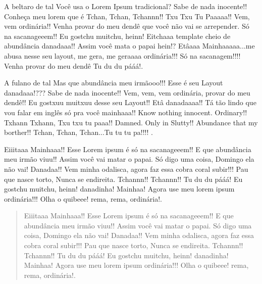 \documentclass{abnt}
\begin{document}
  \begin{agradecimentos}
  A beltaro de tal Você usa o Lorem Ipsum tradicional? Sabe de nada inocente!! Conheça meu lorem que é Tchan, Tchan, Tchannn!! Txu Txu Tu Paaaaa!! Vem, vem ordinária!! Venha provar do meu dendê que você não vai se arrepender. Só na sacanageeem!! Eu gostchu muitchu, heinn! Eitchaaa template cheio de abundância danadaaa!! Assim você mata o papai hein!? Etâaaa Mainhaaaaa...me abusa nesse seu layout, me gera, me geraaaa ordinária!!! Só na sacanagem!!!! Venha provar do meu dendê Tu du du pááá!.
  
  A fulano de tal Mas que abundância meu irmãooo!!! Esse é seu Layout danadaaa!??? Sabe de nada inocente!! Vem, vem, vem ordinária, provar do meu dendê!! Eu gostxuu muitxuu desse seu Layout!! Etâ danadaaaa!! Tá tão lindo que vou falar em inglês só pra você mainhaaa!! Know nothing innocent. Ordinary!! Txhann Txhann, Txu txu tu paaa!! Damned. Only in Slutty!! Abundance that my borther!! Tchan, Tchan, Tchan...Tu tu tu pa!!!!  .
  \end{agradecimentos}
  \begin{resumo}
  Eiiitaaa Mainhaaa!! Esse Lorem ipsum é só na sacanageeem!! E que abundância meu irmão viuu!! Assim você vai matar o papai. Só digo uma coisa, Domingo ela não vai! Danadaa!! Vem minha odalisca, agora faz essa cobra coral subir!!! Pau que nasce torto, Nunca se endireita. Tchannn!! Tchannn!! Tu du du pááá! Eu gostchu muitchu, heinn! danadinha! Mainhaa! Agora use meu lorem ipsum ordinária!!! Olha o quibeee! rema, rema, ordinária!.
  \end{resumo}
  
  \begin{abstract}
  Eiiitaaa Mainhaaa!! Esse Lorem ipsum é só na sacanageeem!! E que abundância meu irmão viuu!! Assim você vai matar o papai. Só digo uma coisa, Domingo ela não vai! Danadaa!! Vem minha odalisca, agora faz essa cobra coral subir!!! Pau que nasce torto, Nunca se endireita. Tchannn!! Tchannn!! Tu du du pááá! Eu gostchu muitchu, heinn! danadinha! Mainhaa! Agora use meu lorem ipsum ordinária!!! Olha o quibeee! rema, rema, ordinária!.
  \end{abstract}

 \listadetabelas%
 \listadefiguras%
 \listadesimbolos
 
\end{document}
